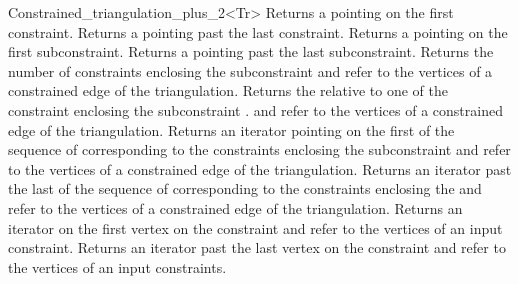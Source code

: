 \begin{ccRefClass}{Constrained_triangulation_plus_2<Tr>}
{Returns a  pointing on the first
constraint.}
\ccGlue
{}
{Returns a  pointing past the last
constraint.}
\ccGlue
{}
{Returns a  pointing on the first
subconstraint.}
\ccGlue
{}
{Returns a  pointing past the last
subconstraint.}
\ccGlue
{}
{Returns the number of constraints enclosing the subconstraint
\ccPrecond {} and  refer to  the vertices
of a constrained edge of the triangulation.}
\ccGlue
{}
{Returns the   relative to  one of the constraint 
enclosing  the subconstraint  .
\ccPrecond {} and  refer to  the vertices
of a constrained edge of the triangulation.}
\ccGlue
{}
{Returns an iterator pointing on the first 
of the sequence of 
corresponding to the constraints enclosing the subconstraint
\ccPrecond {} and  refer to  the vertices
of a constrained edge of the triangulation.}
\ccGlue
{}
{Returns an iterator past the last  
of the sequence of 
corresponding to the constraints enclosing the  
\ccPrecond {} and  refer to  the vertices
of a constrained edge of the triangulation.}
\ccGlue
{}
{Returns an iterator on the first vertex on the constraint
\ccPrecond {} and  refer to  the vertices
of an input constraint.}
\ccGlue
{}
{Returns an iterator past  the last  vertex on  the constraint
\ccPrecond {} and  refer to  the vertices
of an input constraints.}


\ccSeeAlso
{} \\
 \\
 \\


\end{ccRefClass}
